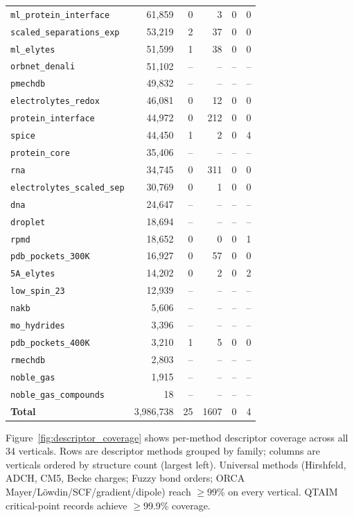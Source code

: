 \begin{table}[h]
\begin{tabular}{lrrrrr}
  \texttt{ml\_protein\_interface} & 61,859 & 0 & 3 & 0 & 0 \\
  \texttt{scaled\_separations\_exp} & 53,219 & 2 & 37 & 0 & 0 \\
  \texttt{ml\_elytes} & 51,599 & 1 & 38 & 0 & 0 \\
  \texttt{orbnet\_denali} & 51,102 & -- & -- & -- & -- \\
  \texttt{pmechdb} & 49,832 & -- & -- & -- & -- \\
  \texttt{electrolytes\_redox} & 46,081 & 0 & 12 & 0 & 0 \\
  \texttt{protein\_interface} & 44,972 & 0 & 212 & 0 & 0 \\
  \texttt{spice} & 44,450 & 1 & 2 & 0 & 4 \\
  \texttt{protein\_core} & 35,406 & -- & -- & -- & -- \\
  \texttt{rna} & 34,745 & 0 & 311 & 0 & 0 \\
  \texttt{electrolytes\_scaled\_sep} & 30,769 & 0 & 1 & 0 & 0 \\
  \texttt{dna} & 24,647 & -- & -- & -- & -- \\
  \texttt{droplet} & 18,694 & -- & -- & -- & -- \\
  \texttt{rpmd} & 18,652 & 0 & 0 & 0 & 1 \\
  \texttt{pdb\_pockets\_300K} & 16,927 & 0 & 57 & 0 & 0 \\
  \texttt{5A\_elytes} & 14,202 & 0 & 2 & 0 & 2 \\
  \texttt{low\_spin\_23} & 12,939 & -- & -- & -- & -- \\
  \texttt{nakb} & 5,606 & -- & -- & -- & -- \\
  \texttt{mo\_hydrides} & 3,396 & -- & -- & -- & -- \\
  \texttt{pdb\_pockets\_400K} & 3,210 & 1 & 5 & 0 & 0 \\
  \texttt{rmechdb} & 2,803 & -- & -- & -- & -- \\
  \texttt{noble\_gas} & 1,915 & -- & -- & -- & -- \\
  \texttt{noble\_gas\_compounds} & 18 & -- & -- & -- & -- \\
\midrule
  \textbf{Total} & 3,986,738 & 25 & 1607 & 0 & 4 \\
\bottomrule
\end{tabular}
\end{table}

\vspace{1em}
Figure~\ref{fig:descriptor_coverage} shows per-method descriptor coverage
across all 34 verticals. Rows are descriptor methods grouped by family;
columns are verticals ordered by structure count (largest left).
Universal methods (Hirshfeld, ADCH, CM5, Becke charges; Fuzzy bond orders;
ORCA Mayer/L\"owdin/SCF/gradient/dipole) reach $\geq$99\% on every vertical.
QTAIM critical-point records achieve $\geq$99.9\% coverage.

